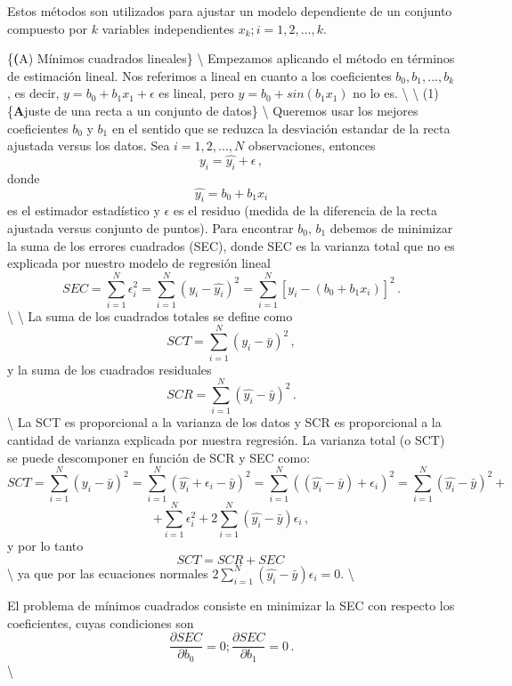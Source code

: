 \documentclass[
]{agujournal2019}
\begin{document}
\noindent Estos métodos son utilizados para ajustar un modelo
dependiente de un conjunto compuesto por \(k\) variables independientes
\(x_k;i=1,2,...,k\).

\vspace{0.5cm}

\{\noindent \textbf (A) \large Mínimos cuadrados lineales\}
\textbackslash{} Empezamos aplicando el método en términos de estimación
lineal. Nos referimos a lineal en cuanto a los coeficientes
\(b_0, b_1,...,b_k\), es decir, \(y=b_0 + b_1x_1 + \epsilon\) es lineal,
pero \(y=b_0+sin(b_1x_1)\) no lo es. \textbackslash{} \textbackslash{}
(1) \{\textbf Ajuste de una recta a un conjunto de datos\}
\textbackslash{} \noindent Queremos usar los mejores coeficientes
\(b_0\) y \(b_1\) en el sentido que se reduzca la desviación estandar de
la recta ajustada versus los datos. Sea \(i=1,2,...,N\) observaciones,
entonces \[y_i=\hat{y_i} + \epsilon\,,\] donde \[\hat{y_i}=b_0+b_1 x_i\]
es el estimador estadístico y \(\epsilon\) es el residuo (medida de la
diferencia de la recta ajustada versus conjunto de puntos). Para
encontrar \(b_0, \, b_1\) debemos de minimizar la suma de los errores
cuadrados (SEC), donde SEC es la varianza total que no es explicada por
nuestro modelo de regresión lineal
\[SEC=\sum^N_{i=1} \epsilon^2_i=\sum^N_{i=1} (y_i - \hat{y_i})^2=\sum^N_{i=1} [y_i - (b_0+b_1 x_i)]^2\,.\]
\textbackslash{} \textbackslash{} La suma de los cuadrados totales se
define como \[SCT=\sum^N_{i=1} (y_i - \bar{y})^2\,,\] y la suma de los
cuadrados residuales \[SCR=\sum^N_{i=1} (\hat{y_i} - \bar{y})^2\,.\]
\textbackslash{} La SCT es proporcional a la varianza de los datos y SCR
es proporcional a la cantidad de varianza explicada por nuestra
regresión. La varianza total (o SCT) se puede descomponer en función de
SCR y SEC como:
\[SCT=\sum^N_{i=1}(y_i-\bar{y})^2 = \sum^N_{i=1}(\hat{y_i} + \epsilon_i - \bar{y})^2
=\sum^N_{i=1}((\hat{y_i}- \bar{y}) + \epsilon_i)^2=\sum^N_{i=1}(\hat{y_i}- \bar{y})^2 +\]
\[+\sum^N_{i=1}\epsilon_i^2 + 2\sum^N_{i=1}(\hat{y_i}- \bar{y})\epsilon_i\,,\]
y por lo tanto \[SCT=SCR + SEC\,\] \textbackslash{} ya que por las
ecuaciones normales \(2\sum^N_{i=1}(\hat{y_i}- \bar{y})\epsilon_i=0\).
\textbackslash{}

\noindent El problema de mínimos cuadrados consiste en minimizar la SEC
con respecto los coeficientes, cuyas condiciones son
\[\frac{\partial{SEC}}{\partial{b_0}}=0; \frac{\partial{SEC}}{\partial{b_1}}=0\,.\]
\textbackslash{}
\end{document}
